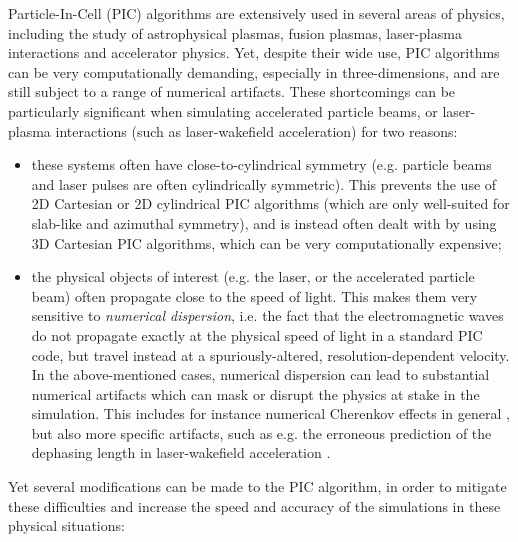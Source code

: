 \documentclass[1p,times]{elsarticle}
\begin{document}
Particle-In-Cell (PIC) algorithms \citep{Birdsall2004,Hockney1988} 
are extensively used in several areas of physics, including the study
of astrophysical plasmas, fusion plasmas, laser-plasma
interactions and accelerator physics. Yet,
despite their wide use, PIC algorithms can be very computationally
demanding, especially in three-dimensions, and are still subject to a range of numerical artifacts. 
These shortcomings can be particularly significant when simulating 
accelerated particle beams, or 
laser-plasma interactions (such as laser-wakefield acceleration) for two reasons:
\begin{itemize}
\item 
these systems often have close-to-cylindrical
  symmetry (e.g. particle beams and laser pulses are often
  cylindrically symmetric). This prevents the use of 2D Cartesian 
or 2D cylindrical PIC algorithms (which are only well-suited for slab-like and azimuthal symmetry),
and is instead often dealt with by using
  3D Cartesian PIC algorithms, which can be very 
computationally expensive; 
\item the physical objects of interest (e.g. the laser, or the
  accelerated particle beam) often propagate close to the speed of
  light. This makes them very sensitive to \emph{numerical
    dispersion}, i.e. the fact that the electromagnetic waves do not
  propagate exactly at the physical speed of light in a standard PIC
  code, but travel instead at a spuriously-altered,
  resolution-dependent velocity. In the above-mentioned cases, 
numerical dispersion can lead to substantial numerical artifacts
which can mask or disrupt the physics at stake in the simulation. This
includes for instance numerical Cherenkov effects in general
\citep{GodfreyJCP1974}, but also more specific artifacts, such as
e.g. the erroneous prediction of the dephasing length in
laser-wakefield acceleration \citep{CowanPRSTAB2013}.

\end{itemize}
Yet several modifications can be made to the PIC algorithm, in order
to mitigate these difficulties and increase the speed and
accuracy of the simulations in these physical situations: 
\end{document}
